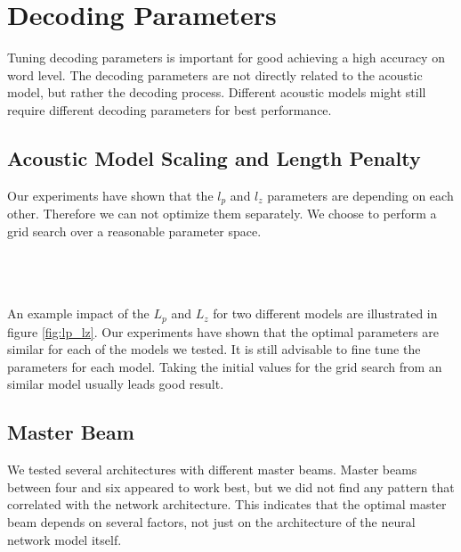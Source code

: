 \section{Decoding Parameters}
Tuning decoding parameters is important for good achieving a high accuracy on word level. The decoding parameters are not directly related to the acoustic model, but rather the decoding process. Different acoustic models might still require different decoding parameters for best performance. 
\subsection{Acoustic Model Scaling and Length Penalty}
Our experiments have shown that the $l_p$ and $l_z$ parameters are depending on each other. Therefore we can not optimize them separately. We choose to perform a grid search over a reasonable parameter space. \\ \\
\begin{minipage}{\linewidth}
\centering
{}
\label{fig:lp_lz}
\end{minipage}
\\ \\
An example impact of the $L_p$ and $L_z$ for two different models are illustrated in figure \ref{fig:lp_lz}. Our experiments have shown that the optimal parameters are similar for each of the models we tested. It is still advisable to fine tune the parameters for each model. Taking the initial values for the grid search from an similar model usually leads good result.
\subsection{Master Beam}
We tested several architectures with different master beams. Master beams between four and six appeared to work best, but we did not find any pattern that correlated with the network architecture. This indicates that the optimal master beam depends on several factors, not just on the architecture of the neural network model itself. 
